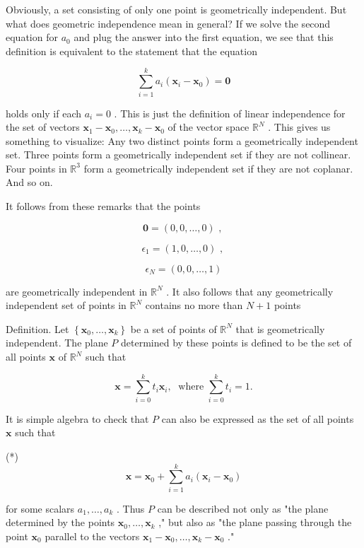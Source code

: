 Obviously, a set consisting of only one point is geometrically independent. But what does geometric independence mean in general? If we solve the second equation for \({a}_{0}\) and plug the answer into the first equation, we see that this definition is equivalent to the statement that the equation

\[
\mathop{\sum }\limits_{{i = 1}}^{k}{a}_{i}\left( {{\mathbf{x}}_{i} - {\mathbf{x}}_{0}}\right)  = \mathbf{0}
\]

holds only if each \({a}_{i} = 0\) . This is just the definition of linear independence for the set of vectors \({\mathbf{x}}_{1} - {\mathbf{x}}_{0},\ldots ,{\mathbf{x}}_{k} - {\mathbf{x}}_{0}\) of the vector space \({\mathbb{R}}^{N}\) . This gives us something to visualize: Any two distinct points form a geometrically independent set. Three points form a geometrically independent set if they are not collinear. Four points in \({\mathbb{R}}^{3}\) form a geometrically independent set if they are not coplanar. And so on.

It follows from these remarks that the points

\[
\mathbf{0} = \left( {0,0,\ldots ,0}\right) \text{ , }
\]

\[
{\epsilon }_{1} = \left( {1,0,\ldots ,0}\right) \text{ , }
\]

\[
{\epsilon }_{N} = \left( {0,0,\ldots ,1}\right)
\]

are geometrically independent in \({\mathbb{R}}^{N}\) . It also follows that any geometrically independent set of points in \({\mathbb{R}}^{N}\) contains no more than \(N + 1\) points

Definition. Let \(\left\{  {{\mathbf{x}}_{0},\ldots ,{\mathbf{x}}_{k}}\right\}\) be a set of points of \({\mathbb{R}}^{N}\) that is geometrically independent. The plane \(P\) determined by these points is defined to be the set of all points \(\mathbf{x}\) of \({\mathbb{R}}^{N}\) such that

\[
\mathbf{x} = \mathop{\sum }\limits_{{i = 0}}^{k}{t}_{i}{\mathbf{x}}_{i},\;\text{ where }\mathop{\sum }\limits_{{i = 0}}^{k}{t}_{i} = 1.
\]

It is simple algebra to check that \(P\) can also be expressed as the set of all points \(\mathbf{x}\) such that

(*)
\[
\mathbf{x} = {\mathbf{x}}_{0} + \mathop{\sum }\limits_{{i = 1}}^{k}{a}_{i}\left( {{\mathbf{x}}_{i} - {\mathbf{x}}_{0}}\right)
\]

for some scalars \({a}_{1},\ldots ,{a}_{k}\) . Thus \(P\) can be described not only as "the plane determined by the points \({\mathbf{x}}_{0},\ldots ,{\mathbf{x}}_{k}\) ," but also as "the plane passing through the point \({\mathbf{x}}_{0}\) parallel to the vectors \({\mathbf{x}}_{1} - {\mathbf{x}}_{0},\ldots ,{\mathbf{x}}_{k} - {\mathbf{x}}_{0}\) ."

